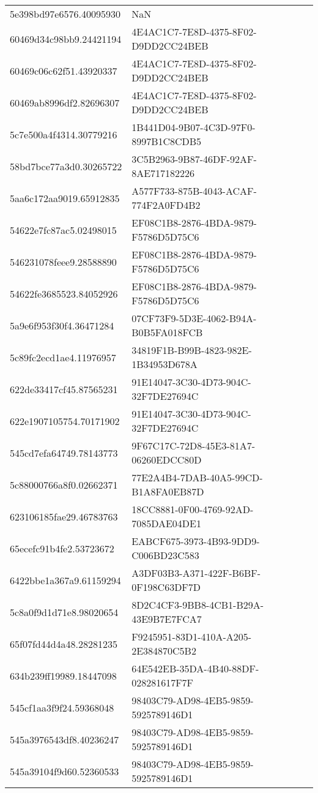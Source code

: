 \begin{tabular}{ll}
5e398bd97e6576.40095930 & NaN \\
60469d34c98bb9.24421194 & 4E4AC1C7-7E8D-4375-8F02-D9DD2CC24BEB \\
60469c06c62f51.43920337 & 4E4AC1C7-7E8D-4375-8F02-D9DD2CC24BEB \\
60469ab8996df2.82696307 & 4E4AC1C7-7E8D-4375-8F02-D9DD2CC24BEB \\
5c7e500a4f4314.30779216 & 1B441D04-9B07-4C3D-97F0-8997B1C8CDB5 \\
58bd7bce77a3d0.30265722 & 3C5B2963-9B87-46DF-92AF-8AE717182226 \\
5aa6c172aa9019.65912835 & A577F733-875B-4043-ACAF-774F2A0FD4B2 \\
54622e7fc87ac5.02498015 & EF08C1B8-2876-4BDA-9879-F5786D5D75C6 \\
546231078feee9.28588890 & EF08C1B8-2876-4BDA-9879-F5786D5D75C6 \\
54622fe3685523.84052926 & EF08C1B8-2876-4BDA-9879-F5786D5D75C6 \\
5a9e6f953f30f4.36471284 & 07CF73F9-5D3E-4062-B94A-B0B5FA018FCB \\
5c89fc2ecd1ae4.11976957 & 34819F1B-B99B-4823-982E-1B34953D678A \\
622de33417cf45.87565231 & 91E14047-3C30-4D73-904C-32F7DE27694C \\
622e1907105754.70171902 & 91E14047-3C30-4D73-904C-32F7DE27694C \\
545cd7efa64749.78143773 & 9F67C17C-72D8-45E3-81A7-06260EDCC80D \\
5c88000766a8f0.02662371 & 77E2A4B4-7DAB-40A5-99CD-B1A8FA0EB87D \\
623106185fae29.46783763 & 18CC8881-0F00-4769-92AD-7085DAE04DE1 \\
65ecefc91b4fe2.53723672 & EABCF675-3973-4B93-9DD9-C006BD23C583 \\
6422bbe1a367a9.61159294 & A3DF03B3-A371-422F-B6BF-0F198C63DF7D \\
5c8a0f9d1d71e8.98020654 & 8D2C4CF3-9BB8-4CB1-B29A-43E9B7E7FCA7 \\
65f07fd44d4a48.28281235 & F9245951-83D1-410A-A205-2E384870C5B2 \\
634b239ff19989.18447098 & 64E542EB-35DA-4B40-88DF-028281617F7F \\
545cf1aa3f9f24.59368048 & 98403C79-AD98-4EB5-9859-5925789146D1 \\
545a3976543df8.40236247 & 98403C79-AD98-4EB5-9859-5925789146D1 \\
545a39104f9d60.52360533 & 98403C79-AD98-4EB5-9859-5925789146D1 \\

\end{tabular}
